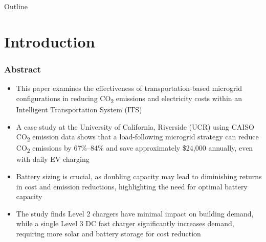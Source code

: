 \documentclass[aspectratio=169, 8 pt]{beamer}
\begin{document}
	
	\begin{frame}{Outline}
		\vfill
		\tableofcontents
		\vfill
	\end{frame}
	
	\section{Introduction}
	
	\begin{frame}
		\frametitle{Abstract}	
		\begin{itemize} \LARGE
			\item This paper examines the effectiveness of transportation-based microgrid configurations in reducing CO\textsubscript{2} emissions and electricity costs within an Intelligent Transportation System (ITS)
			\item A case study at the University of California, Riverside (UCR) using CAISO CO\textsubscript{2} emission data shows that a load-following microgrid strategy can reduce CO\textsubscript{2} emissions by 67\%–84\% and save approximately \$24,000 annually, even with daily EV charging
			\item Battery sizing is crucial, as doubling capacity may lead to diminishing returns in cost and emission reductions, highlighting the need for optimal battery capacity
			\item The study finds Level 2 chargers have minimal impact on building demand, while a single Level 3 DC fast charger significantly increases demand, requiring more solar and battery storage for cost reduction
		\end{itemize}
		
\end{frame}
\end{document}
